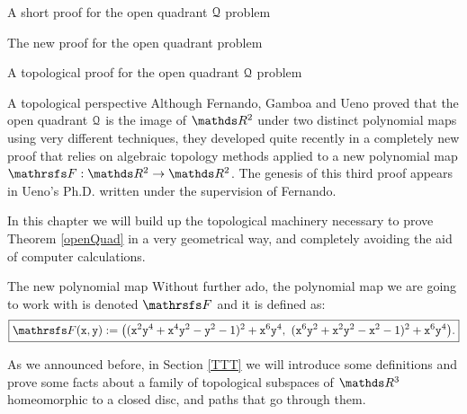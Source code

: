 \documentclass[11pt, a4paper, english, twoside, notitlepage, openright]{report}
\begin{document}
\begin{chapter}{A short proof for the open quadrant $\mathcal{Q}$ problem}
\begin{section}{The new proof for the open quadrant problem}
\end{section}
\end{chapter}

\begin{chapter}{A topological proof for the open quadrant $\mathcal{Q}$ problem}
\begin{section}{A topological perspective}
Although Fernando, Gamboa and Ueno proved that the open quadrant $\mathcal{Q}$ is the image of $\R^2$ under two distinct polynomial maps using very different techniques, they developed quite recently in \cite{fgu} a completely new proof that relies on algebraic topology methods applied to a new polynomial map $\FFF:\R^2\to\R^2$. The genesis of this third proof appears in Ueno's Ph.D. \cite{u} written under the supervision of Fernando. 

In this chapter we will build up the topological machinery necessary to prove Theorem \ref{openQuad} in a very geometrical way, and completely avoiding the aid of computer calculations.
\begin{subsection}{The new polynomial map}
Without further ado, the polynomial map we are going to work with is denoted $\FFF$ and it is defined as:
\begin{equation*}\label{eq:thirdMap}
\boxed{
\FFF({\tt x}, {\tt y}) := \big(({\tt x}^2{\tt y}^4+{\tt x}^4{\tt y}^2-{\tt y}^2-1)^2+{\tt x}^6{\tt y}^4,\ ({\tt x}^6{\tt y}^2+{\tt x}^2{\tt y}^2-{\tt x}^2-1)^2+{\tt x}^6{\tt y}^4\big).
}
\end{equation*}

As we announced before, in Section \ref{TTT} we will introduce some definitions and prove some facts about a family of topological subspaces of $\R^3$ homeomorphic to a closed disc, and paths that go through them.

\vspace{1mm}


\end{subsection}
\end{section}
\end{chapter}
\end{document}
